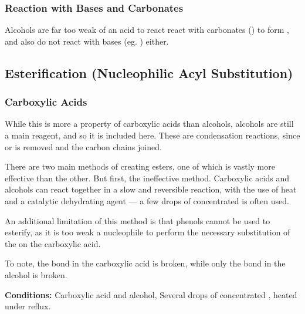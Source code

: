 
			\subsubsection{Reaction with Bases and Carbonates}

				Alcohols are far too weak of an acid to react react with carbonates () to form , and also do not
				react with bases (eg. ) either.



		\subsection{Esterification (Nucleophilic Acyl Substitution)}

			\subsubsection{Carboxylic Acids}

				While this is more a property of carboxylic acids than alcohols, alcohols are still a main reagent, and so it is included here.
				These are condensation reactions, since  or  is removed and the carbon chains joined.

				There are two main methods of creating esters, one of which is vastly more effective than the other. But first, the ineffective
				method. Carboxylic acids and alcohols can react together in a slow and reversible reaction, with the use of heat and a
				catalytic dehydrating agent –– a few drops of concentrated  is often used.

				An additional limitation of this method is that phenols cannot be used to esterify, as it is too weak a nucleophile to
				perform the necessary substitution of the  on the carboxylic acid.

				To note, the  bond in the carboxylic acid is broken, while only the  bond in the alcohol is broken.

				\vspace{1.5em}
				\vbox{\textbf{Conditions:}	\tabto{35mm}Carboxylic acid and alcohol,
											\tabto{35mm}Several drops of concentrated , heated under reflux.}



